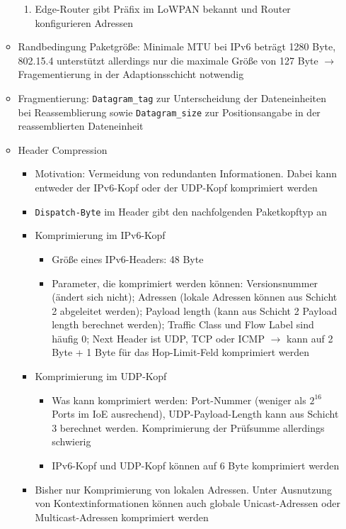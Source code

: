 \begin{itemize}
\begin{itemize}
\begin{enumerate}
			\item Edge-Router gibt Präfix im LoWPAN bekannt und Router konfigurieren Adressen
		\end{enumerate}
		\item Randbedingung Paketgröße: Minimale MTU bei IPv6 beträgt 1280 Byte, 802.15.4 unterstützt allerdings nur die maximale Größe von 127 Byte \(\rightarrow\) Fragementierung in der Adaptionsschicht notwendig
		\item Fragmentierung: \texttt{Datagram\_tag} zur Unterscheidung der Dateneinheiten bei Reassemblierung sowie \texttt{Datagram\_size} zur Positionsangabe in der reassemblierten Dateneinheit
		\item Header Compression
		\begin{itemize}
			\item Motivation: Vermeidung von redundanten Informationen. Dabei kann entweder der IPv6-Kopf oder der UDP-Kopf komprimiert werden
			\item \texttt{Dispatch-Byte} im Header gibt den nachfolgenden Paketkopftyp an
			\item Komprimierung im IPv6-Kopf
			\begin{itemize}
				\item Größe eines IPv6-Headers: 48 Byte
				\item Parameter, die komprimiert werden können: Versionsnummer (ändert sich nicht); Adressen (lokale Adressen können aus Schicht 2 abgeleitet werden); Payload length (kann aus Schicht 2 Payload length berechnet werden); Traffic Class und Flow Label sind häufig \(0\); Next Header ist UDP, TCP oder ICMP \(\rightarrow\) kann auf 2 Byte + 1 Byte für das Hop-Limit-Feld komprimiert werden
			\end{itemize}
			\item Komprimierung im UDP-Kopf
			\begin{itemize}
				\item Was kann komprimiert werden: Port-Nummer (weniger als \(2^{16}\) Ports im IoE ausrechend), UDP-Payload-Length kann aus Schicht 3 berechnet werden. Komprimierung der Prüfsumme allerdings schwierig
				\item IPv6-Kopf und UDP-Kopf können auf 6 Byte komprimiert werden
			\end{itemize}
			\item Bisher nur Komprimierung von lokalen Adressen. Unter Ausnutzung von Kontextinformationen können auch globale Unicast-Adressen oder Multicast-Adressen komprimiert werden
		\end{itemize}

\end{itemize}
\end{itemize}
